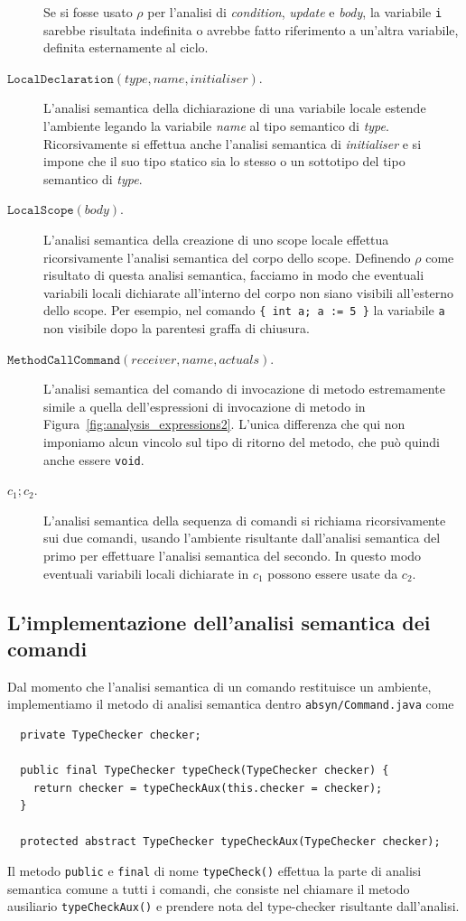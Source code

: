 \begin{description}
  Se si fosse usato $\rho$ per l'analisi di \emph{condition}, \emph{update} e
  \emph{body},
  la variabile \texttt{i} sarebbe risultata indefinita o avrebbe fatto
  riferimento a un'altra variabile, definita esternamente al ciclo.
\item[\underline{$\mathtt{LocalDeclaration(\mathit{type},\mathit{name},\mathit{initialiser})}$}.]
  L'analisi semantica della dichiarazione di una variabile locale estende
  l'ambiente legando la variabile \textit{name} al tipo semantico di
  \textit{type}. Ricorsivamente si effettua anche
  l'analisi semantica di \textit{initialiser} e si impone che il suo tipo
  statico sia lo stesso o un sottotipo del tipo semantico di \textit{type}.
\item[\underline{$\mathtt{LocalScope(\mathit{body})}$}.]
  L'analisi semantica della creazione di uno scope locale effettua
  ricorsivamente l'analisi semantica del corpo dello scope. Definendo
  $\rho$ come risultato di questa analisi semantica, facciamo in modo che
  eventuali variabili locali dichiarate all'interno del corpo
  non siano \piu visibili all'esterno dello scope. Per esempio, nel comando
  \verb!{ int a; a := 5 }! la variabile
  \texttt{a} non \e \piu visibile dopo la parentesi graffa di chiusura.
\item[\underline{$\mathtt{MethodCallCommand(\mathit{receiver},\mathit{name},\mathit{actuals})}$}.]
  L'analisi semantica del comando di invocazione di metodo \e
  estremamente simile a quella dell'espressioni di invocazione di metodo
  in Figura~\ref{fig:analysis_expressions2}. L'unica differenza \e che qui
  non imponiamo alcun vincolo sul tipo di ritorno del metodo, che pu\`o
  quindi anche essere \texttt{void}.
\item[\underline{$c_1;c_2$}.]
  L'analisi semantica della sequenza di comandi si richiama ricorsivamente
  sui due comandi, usando l'ambiente risultante dall'analisi semantica del
  primo per effettuare l'analisi semantica del secondo. In questo modo
  eventuali variabili locali dichiarate in $c_1$ possono essere usate da $c_2$.
\end{description}
%
\subsection{L'implementazione dell'analisi semantica dei comandi}
  \label{subsec:analysis_commands_implementation}
%
Dal momento che l'analisi semantica di un comando restituisce un ambiente, implementiamo
il metodo di analisi semantica dentro \texttt{absyn/Command.java} come
%
\begin{verbatim}
  private TypeChecker checker;

  public final TypeChecker typeCheck(TypeChecker checker) {
    return checker = typeCheckAux(this.checker = checker);
  }

  protected abstract TypeChecker typeCheckAux(TypeChecker checker);
\end{verbatim}
%
Il metodo \texttt{public} e \texttt{final} di nome \texttt{typeCheck()}
effettua la parte di analisi semantica comune a tutti i comandi, che consiste
nel chiamare il metodo ausiliario \texttt{typeCheckAux()} e prendere nota del
type-checker risultante dall'analisi.

